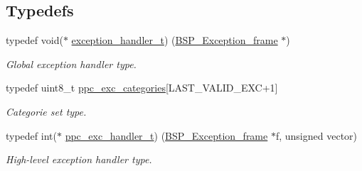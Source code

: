\subsection*{Typedefs}
\begin{DoxyCompactItemize}
\item 
\mbox{\label{group__ppc__exc_gac5e884904b6b113cd137dc1b824b1ff3}} 
typedef void($\ast$ \mbox{\hyperlink{group__ppc__exc_gac5e884904b6b113cd137dc1b824b1ff3}{exception\+\_\+handler\+\_\+t}}) (\mbox{\hyperlink{structCPU__Exception__frame}{B\+S\+P\+\_\+\+Exception\+\_\+frame}} $\ast$)
\begin{DoxyCompactList}\small\item\em Global exception handler type. \end{DoxyCompactList}\item 
\mbox{\label{group__ppc__exc_ga2a53861cc46267097fbb775d863a294f}} 
typedef uint8\+\_\+t \mbox{\hyperlink{group__ppc__exc_ga2a53861cc46267097fbb775d863a294f}{ppc\+\_\+exc\+\_\+categories}}\mbox{[}L\+A\+S\+T\+\_\+\+V\+A\+L\+I\+D\+\_\+\+E\+XC+1\mbox{]}
\begin{DoxyCompactList}\small\item\em Categorie set type. \end{DoxyCompactList}\item 
typedef int($\ast$ \mbox{\hyperlink{group__ppc__exc_ga310d4349fafb7f5d8d5e89d6c6f39ab9}{ppc\+\_\+exc\+\_\+handler\+\_\+t}}) (\mbox{\hyperlink{structCPU__Exception__frame}{B\+S\+P\+\_\+\+Exception\+\_\+frame}} $\ast$f, unsigned vector)
\begin{DoxyCompactList}\small\item\em High-\/level exception handler type. \end{DoxyCompactList}\end{DoxyCompactItemize}
